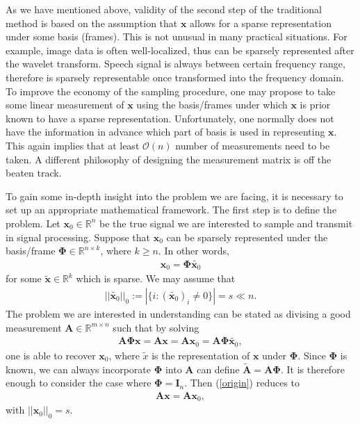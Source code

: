 \documentclass[11pt]{article}
\numberwithin{equation}{section}
\theoremstyle{plain}
\theoremstyle{definition}
\def\R{{\mathbb R}}
\def\R{{\mathbb R}}
\def\A{{\mathbf A}}
\def\x{{\mathbf x}}
\def\Ph{{\mathbf {\Phi}}}
\begin{document}
As we have mentioned above, validity of the second step of the traditional method is based on the assumption that $\x$ allows for a sparse representation under some basis (frames). This is not unusual in many practical situations. For example, image data is often well-localized, thus can be sparsely represented after the wavelet transform. Speech signal is always between certain frequency range, therefore is sparsely representable once transformed into the frequency domain. To improve the economy of the sampling procedure, one may propose to take some linear measurement of $\x$ using the basis/frames under which $\x$ is prior known to have a sparse representation. Unfortunately, one normally does not have the information in advance which part of basis is used in representing $\x$. This again implies that at least $\mathcal{O}(n)$ number of measurements need to be taken. A different philosophy of designing the measurement matrix is off the beaten track. 

To gain some in-depth insight into the problem we are facing, it is necessary to set up an appropriate mathematical framework. The first step is to define the problem. Let $\x_0\in\R^n$ be the true signal we are interested to sample and transmit in signal processing. Suppose that $\x_0$ can be sparsely represented under the basis/frame $\Ph\in\R^{n\times k}$, where $k\geq n$. In other words,
\begin{align*}
\x_0 = \Ph\tilde{\x_0}
\end{align*} 
for some $\tilde{\x}\in\R^k$ which is sparse. We may assume that 
\begin{align*}
||\tilde{\x_0}||_0:=\left|\{i:  (\tilde{\x_0})_i\neq 0\}\right|=s\ll n.
\end{align*}
The problem we are interested in understanding can be stated as divising a good measurement $\A\in\R^{m\times n}$ such that by solving 
\begin{align}
\A\Ph\x=\A\x = \A\x_0 = \A\Ph\tilde{\x_0},\label{origin}
\end{align}    
one is able to recover $\x_0$, where $\tilde{x}$ is the representation of $\x$ under $\Ph$. Since $\Ph$ is known, we can always incorporate $\Ph$ into $\A$ can define $\tilde{\A}=\A\Ph$. It is therefore enough to consider the case where $\Ph=\mathbf{I}_n$. Then (\ref{origin}) reduces to
\begin{align}
\A\x = \A\x_0,\label{origin'}
\end{align} 
with $||\x_0||_0=s$. 
\end{document}
